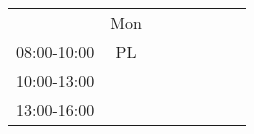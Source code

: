 \begin{table}[!h]
\begin{tabular}{cccccccc}
                                 & Mon                                             &                        &                                                &                        &                                                &                        &                        \\ \cline{2-2}
\multicolumn{1}{c|}{08:00-10:00} & \multicolumn{1}{c|}{\cellcolor[HTML]{FCFF2F}PL} &                        &                                                &                        &                                                &                        &                        \\ \cline{2-2}
\multicolumn{1}{c|}{10:00-13:00} & \multicolumn{1}{c|}{\cellcolor[HTML]{FCFF2F}}   &                        &                                                &                        &                                                &                        &                        \\ \cline{2-2}
\multicolumn{1}{c|}{13:00-16:00} & \multicolumn{1}{c|}{\cellcolor[HTML]{FCFF2F}}   &                        &                                                &                        &                                                &                        &                        \\ \cline{2-2}
\end{tabular}
\end{table}

